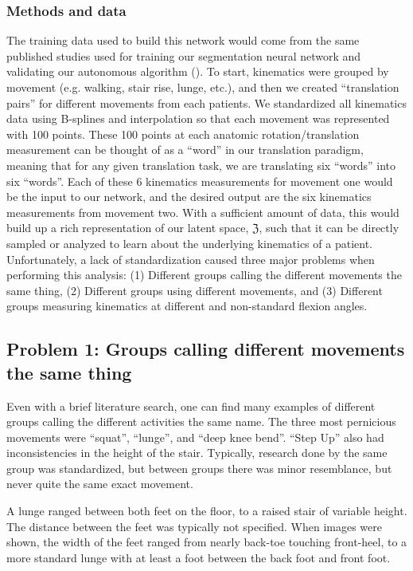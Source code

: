 \subsubsection{Methods and data}
The training data used to build this network would come from the same published studies used for training our segmentation neural network and validating our autonomous algorithm ().
To start, kinematics were grouped by movement (e.g. walking, stair rise, lunge, etc.), and then we created ``translation pairs'' for different movements from each patients.
We standardized all kinematics data using B-splines and interpolation so that each movement was represented with 100 points.
These 100 points at each anatomic rotation/translation measurement can be thought of as a ``word'' in our translation paradigm, meaning that for any given translation task, we are translating six ``words'' into six ``words''.
Each of these 6 kinematics measurements for movement one would be the input to our network, and the desired output are the six kinematics measurements from movement two.
With a sufficient amount of data, this would build up a rich representation of our latent space, $\mathfrak{Z}$, such that it can be directly sampled or analyzed to learn about the underlying kinematics of a patient.
Unfortunately, a lack of standardization caused three major problems when performing this analysis: (1) Different groups calling the different movements the same thing, (2) Different groups using different movements, and (3) Different groups measuring kinematics at different and non-standard flexion angles.

\subsection{Problem 1: Groups calling different movements the same thing}
Even with a brief literature search, one can find many examples of different groups calling the different activities the same name.
The three most pernicious movements were ``squat'', ``lunge'', and ``deep knee bend''. ``Step Up'' also had inconsistencies in the height of the stair.
Typically, research done by the same group was standardized, but between groups there was minor resemblance, but never quite the same exact movement.

A lunge ranged between both feet on the floor, to a raised stair of variable height. The distance between the feet was typically not specified.
When images were shown, the width of the feet ranged from nearly back-toe touching front-heel, to a more standard lunge with at least a foot between the back foot and front foot.

